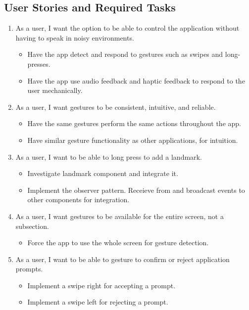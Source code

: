 \documentclass{scrreprt}
\begin{document}
\subsection{User Stories and Required Tasks}
\begin{enumerate}
	\item As a user, I want the option to be able to control the application without having to speak in noisy environments.
	
		\begin{itemize}
			\item Have the app detect and respond to gestures such as swipes and long-presses.
			\item Have the app use audio feedback and haptic feedback to respond to the user mechanically.
		\end{itemize}
		
	\item As a user, I want gestures to be consistent, intuitive, and reliable.
	
		\begin{itemize}
			\item Have the same gestures perform the same actions throughout the app.
			\item Have similar gesture functionality as other applications, for intuition.
		\end{itemize}
		
	\item As a user, I want to be able to long press to add a landmark.

		\begin{itemize}
			\item Investigate landmark component and integrate it.
			\item Implement the observer pattern. Receieve from and broadcast events to other components for integration.
		\end{itemize}
	
	\item As a user, I want gestures to be available for the entire screen, not a subsection.

		\begin{itemize}
			\item Force the app to use the whole screen for gesture detection.
		\end{itemize}
	
	\item As a user, I want to be able to gesture to confirm or reject application prompts.
	
		\begin{itemize}
			\item Implement a swipe right for accepting a prompt.
			\item Implement a swipe left for rejecting a prompt.
		\end{itemize}
		
\end{enumerate}
\end{document}

